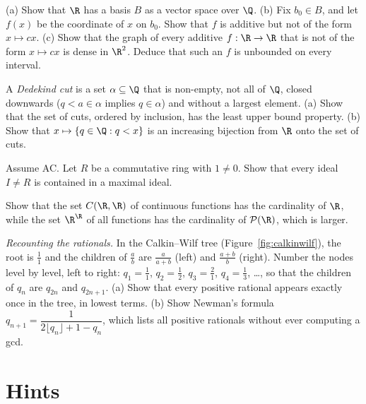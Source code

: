 \begin{exercise}[$\star\star$]\label{ex:hamel}
(a) Show that $\R$ has a basis $B$ as a vector space over $\Q$. (b) Fix $b_0\in B$, and let $f(x)$ be the coordinate of $x$ on $b_0$. Show that $f$ is additive
but not of the form $x\mapsto cx$. (c) Show that the graph of every additive $f:\R\to\R$ that is not of the form $x\mapsto cx$ is dense in $\R^2$. Deduce that
such an $f$ is unbounded on every interval.
\end{exercise}

\begin{exercise}[$\star\star$]\label{ex:cuts}
A \emph{Dedekind cut} is a set $\alpha\subseteq\Q$ that is non-empty, not all of $\Q$, closed downwards ($q<a\in\alpha$ implies $q\in\alpha$) and without a largest
element. (a) Show that the set of cuts, ordered by inclusion, has the least upper bound property. (b) Show that $x\mapsto\{q\in\Q:q<x\}$ is an
increasing bijection from $\R$ onto the set of cuts.
\end{exercise}

\begin{exercise}[$\star\star$]\label{ex:krull}
Assume AC. Let $R$ be a commutative ring with $1\ne0$. Show that every ideal $I\ne R$ is contained in a maximal ideal.
\end{exercise}

\begin{exercise}[$\star\star$]\label{ex:functions}
Show that the set $C(\R,\R)$ of continuous functions has the cardinality of $\R$, while the set $\R^\R$ of all functions has the
cardinality of $\mathcal P(\R)$, which is larger.
\end{exercise}

\begin{exercise}[$\star\star\star$]\label{ex:calkinwilf}
\emph{Recounting the rationals.} In the Calkin--Wilf tree (Figure~\ref{fig:calkinwilf}), the root is $\frac11$ and the children of $\frac ab$ are $\frac a{a+b}$ (left) and
$\frac{a+b}b$ (right). Number the nodes level by level, left to right: $q_1=\frac11$, $q_2=\frac12$, $q_3=\frac21$, $q_4=\frac13$, \ldots, so that the children of
$q_n$ are $q_{2n}$ and $q_{2n+1}$. (a) Show that every positive rational appears exactly once in the tree, in lowest terms.
(b) Show Newman's formula $q_{n+1}=\dfrac1{2\lfloor q_n\rfloor+1-q_n}$, which lists all positive rationals without ever computing a gcd.
\end{exercise}

\section{Hints}

